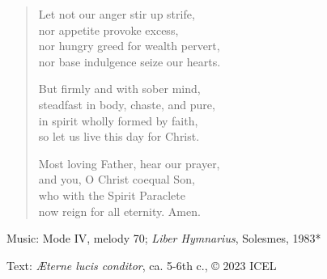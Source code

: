 \hymn



\setlength{\vleftmargin}{2em}
\begin{verse}
  Let not our anger stir up strife,\\
  nor appetite provoke excess,\\
  nor hungry greed for wealth pervert,\\
  nor base indulgence seize our hearts.

  But firmly and with sober mind,\\
  steadfast in body, chaste, and pure,\\
  in spirit wholly formed by faith,\\
  so let us live this day for Christ.

  Most loving Father, hear our prayer,\\
  and you, O Christ coequal Son,\\
  who with the Spirit Paraclete\\
  now reign for all eternity. Amen.
      \end{verse}
  \setlength{\vleftmargin}{\defleftmargini}

\begin{hymnsource}
Music: Mode IV, melody 70; \emph{Liber Hymnarius}, Solesmes, 1983*

Text: \emph{Æterne lucis conditor}, ca. 5-6th c., © 2023 ICEL
\end{hymnsource}
